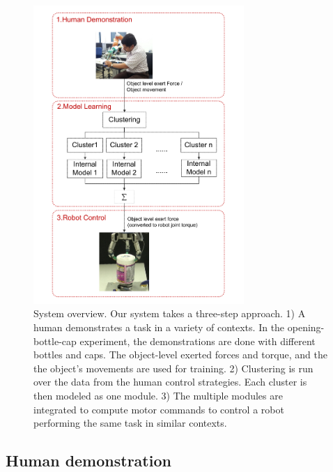 \begin{figure}
  \centering
   \includegraphics[width=8cm]{./fig/overview3.pdf}
   \caption{ \scriptsize{System overview. Our system takes a
       three-step approach. 1) A human demonstrates a task in a
       variety of contexts. In the opening-bottle-cap experiment, the
       demonstrations are done with different bottles and caps. The
       object-level exerted forces and torque, and the the object's
       movements are used for training. 2) Clustering is run over the data from the human control
       strategies. Each cluster is then modeled as one module. 3) The
       multiple modules are integrated to compute motor commands to
       control a robot performing the same task in similar contexts.}  }
\label{fig:overview}
\end{figure}

\subsection{Human demonstration}
\label{sec:demo}


